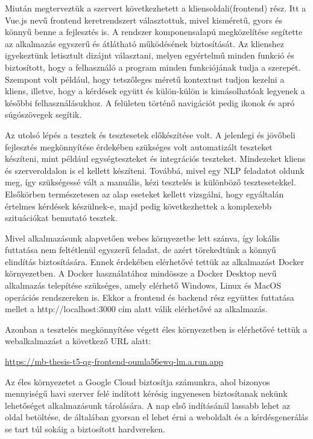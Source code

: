 Miután megterveztük a szervert következhetett a kliensoldali(frontend) rész. Itt a Vue.js nevű frontend keretrendszert választottuk, mivel kisméretű, gyors és könnyű benne a fejlesztés is. A rendszer komponensalapú megközelítése segítette az alkalmazás egyszerű és átlátható működésének biztosítását. Az klienshez igyekeztünk letisztult dizájnt választani, melyen egyértelmű minden funkció és biztosított, hogy a felhasználó a program minden funkciójának tudja a szerepét. Szempont volt például, hogy tetszőleges méretű kontextust tudjon kezelni a kliens, illetve, hogy a kérdések együtt és külön-külön is kimásolhatóak legyenek a későbbi felhasználásukhoz. A felületen történő navigációt pedig ikonok és apró súgószövegek segítik.

Az utolsó lépés a tesztek és tesztesetek előkészítése volt. A jelenlegi és jövőbeli fejlesztés megkönnyítése érdekében szükséges volt automatizált teszteket készíteni, mint például egységteszteket és integrációs teszteket. Mindezeket kliens és szerveroldalon is el kellett készíteni. Továbbá, mivel egy NLP feladatot oldunk meg, így szükségessé vált a manuális, kézi tesztelés is különböző tesztesetekkel. Elsőkörben természetesen az alap eseteket kellett vizsgálni, hogy egyáltalán értelmes kérdések készülnek-e, majd pedig következhettek a komplexebb szituációkat bemutató tesztek.


Mivel alkalmazásunk alapvetően webes környezetbe lett szánva, így lokális futtatása nem feltétlenül egyszerű feladat, de azért törekedtünk a könnyű elindítás biztosítására. Ennek érdekében elérhetővé tettük az alkalmazást Docker környezetben. A Docker használatához mindössze a Docker Desktop nevű alkalmazás telepítése szükséges, amely elérhető Windows, Linux és MacOS operációs rendszereken is. Ekkor a frontend és backend rész együttes futtatása mellet a http://localhost:3000 cím alatt válik elérhetővé az alkalmazás.

Azonban a tesztelés megkönnyítése végett éles környezetben is elérhetővé tettük a webalkalmazást a következő URL alatt:

\vspace{1cm}

\centerline{\url{https://mb-thesis-t5-qg-frontend-oumla56ewq-lm.a.run.app}}

\vspace{1cm}

Az éles környezetet a Google Cloud biztosítja számunkra, ahol bizonyos mennyiségű havi szerver felé indított kérésig ingyenesen biztosítanak nekünk lehetőséget alkalmazásunk tárolására. A nap első indításánál lassabb lehet az oldal betöltése, de általában gyorsan el lehet érni a weboldalt és a kérdésgenerálás se tart túl sokáig a biztosított hardvereken.

